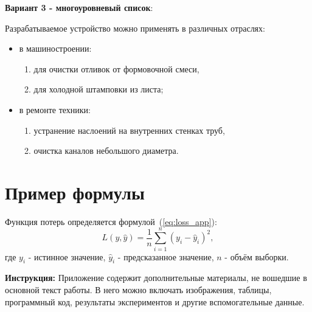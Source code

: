 \textbf{Вариант 3 - многоуровневый список}:

Разрабатываемое устройство можно применять в различных отраслях:
\begin{itemize}
  \item в машиностроении:
    \begin{enumerate}
      \item для очистки отливок от формовочной смеси,
      \item для холодной штамповки из листа;
    \end{enumerate}
  \item в ремонте техники:
    \begin{enumerate}
      \item устранение наслоений на внутренних стенках труб,
      \item очистка каналов небольшого диаметра.
    \end{enumerate}
\end{itemize}

\section*{Пример формулы}

Функция потерь определяется формулой~(\ref{eq:loss_app}):
\begin{equation}
  L(y, \hat{y}) = \frac{1}{n} \sum_{i=1}^{n} (y_i - \hat{y}_i)^2,
  \label{eq:loss_app}
\end{equation}
где $y_i$ - истинное значение, $\hat{y}_i$ - предсказанное значение,
$n$ - объём выборки.

\bigskip
\textbf{Инструкция:} Приложение содержит дополнительные материалы, не
вошедшие в основной текст работы. В него можно включать изображения,
таблицы, программный код, результаты экспериментов и другие
вспомогательные данные.
